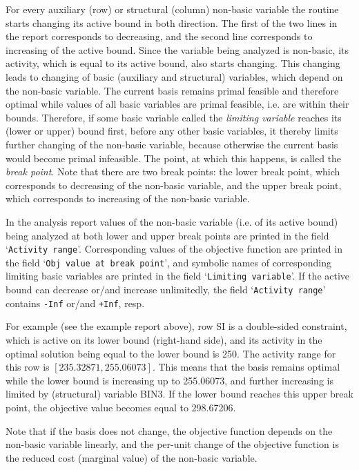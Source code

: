 For every auxiliary (row) or structural (column) non-basic variable the
routine starts changing its active bound in both direction. The first
of the two lines in the report corresponds to decreasing, and the
second line corresponds to increasing of the active bound. Since the
variable being analyzed is non-basic, its activity, which is equal to
its active bound, also starts changing. This changing leads to changing
of basic (auxiliary and structural) variables, which depend on the
non-basic variable. The current basis remains primal feasible and
therefore optimal while values of all basic variables are primal
feasible, i.e. are within their bounds. Therefore, if some basic
variable called the {\it limiting variable} reaches its (lower or
upper) bound first, before any other basic variables, it thereby limits
further changing of the non-basic variable, because otherwise the
current basis would become primal infeasible. The point, at which this
happens, is called the {\it break point}. Note that there are two break
points: the lower break point, which corresponds to decreasing of the
non-basic variable, and the upper break point, which corresponds to
increasing of the non-basic variable.

In the analysis report values of the non-basic variable (i.e. of its
active bound) being analyzed at both lower and upper break points are
printed in the field `{\tt Activity range}'. Corresponding values of
the objective function are printed in the field `{\tt Obj value at
break point}', and symbolic names of corresponding limiting basic
variables are printed in the field `{\tt Limiting variable}'.
If the active bound can decrease or/and increase unlimitedly, the field
`{\tt Activity range}' contains {\tt -Inf} or/and {\tt +Inf}, resp.

For example (see the example report above), row SI is a double-sided
constraint, which is active on its lower bound (right-hand side), and
its activity in the optimal solution being equal to the lower bound is
250. The activity range for this row is $[235.32871,255.06073]$. This
means that the basis remains optimal while the lower bound is
increasing up to 255.06073, and further increasing is limited by
(structural) variable BIN3. If the lower bound reaches this upper break
point, the objective value becomes equal to 298.67206.

Note that if the basis does not change, the objective function depends
on the non-basic variable linearly, and the per-unit change of the
objective function is the reduced cost (marginal value) of the
non-basic variable.

